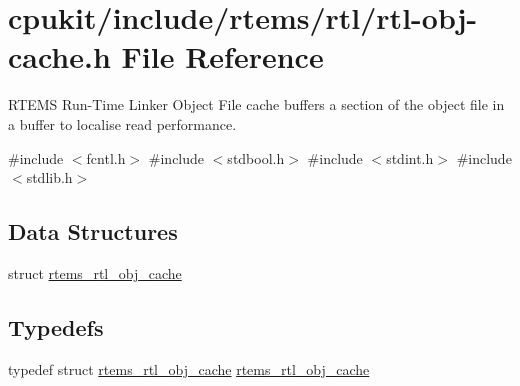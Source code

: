 \hypertarget{rtl-obj-cache_8h}{}\section{cpukit/include/rtems/rtl/rtl-\/obj-\/cache.h File Reference}
\label{rtl-obj-cache_8h}


R\+T\+E\+MS Run-\/\+Time Linker Object File cache buffers a section of the object file in a buffer to localise read performance.  


{\ttfamily \#include $<$fcntl.\+h$>$}\newline
{\ttfamily \#include $<$stdbool.\+h$>$}\newline
{\ttfamily \#include $<$stdint.\+h$>$}\newline
{\ttfamily \#include $<$stdlib.\+h$>$}\newline
\subsection*{Data Structures}
\begin{DoxyCompactItemize}
\item 
struct \mbox{\hyperlink{structrtems__rtl__obj__cache}{rtems\+\_\+rtl\+\_\+obj\+\_\+cache}}
\end{DoxyCompactItemize}
\subsection*{Typedefs}
\begin{DoxyCompactItemize}
\item 
typedef struct \mbox{\hyperlink{structrtems__rtl__obj__cache}{rtems\+\_\+rtl\+\_\+obj\+\_\+cache}} \mbox{\hyperlink{rtl-obj-cache_8h_a81e975e0a01c847123f0c3ed0245c88f}{rtems\+\_\+rtl\+\_\+obj\+\_\+cache}}
\end{DoxyCompactItemize}
